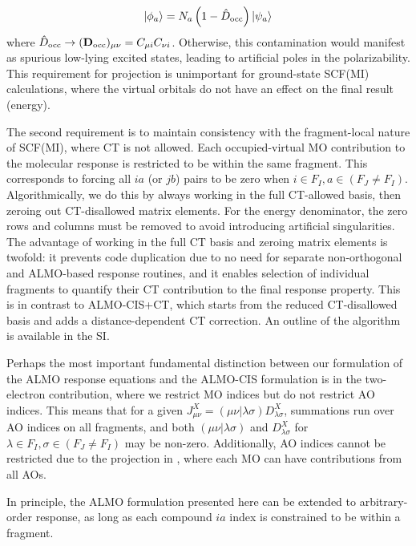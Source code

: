 \documentclass[%
  class = book,%
  crop = false,%
  float = true,%
  multi = true,%
  preview = false,%
]{standalone}
\begin{document}
\begin{equation}
  \label{eq:projected-virtuals}
  \ket{\phi_{a}} = N_{a} \left( 1 - \hat{D}_{\text{occ}} \right) \ket{\psi_{a}}
\end{equation}
where \(\hat{D}_{\text{occ}} \rightarrow (\mathbf{D}_{\text{occ}})_{\mu\nu} = C_{\mu i} C_{\nu i}\). Otherwise, this contamination would manifest as spurious low-lying excited states, leading to artificial poles in the polarizability. This requirement for projection is unimportant for ground-state SCF(MI) calculations, where the virtual orbitals do not have an effect on the final result (energy).

The second requirement is to maintain consistency with the fragment-local nature of SCF(MI), where CT is not allowed. Each occupied-virtual MO contribution to the molecular response is restricted to be within the same fragment. This corresponds to forcing all \(ia\) (or \(jb\)) pairs to be zero when \(i \in F_{I}, a \in (F_{J} \neq F_{I})\). Algorithmically, we do this by always working in the full CT-allowed basis, then zeroing out CT-disallowed matrix elements. For the energy denominator, the zero rows and columns must be removed to avoid introducing artificial singularities. The advantage of working in the full CT basis and zeroing matrix elements is twofold: it prevents code duplication due to no need for separate non-orthogonal and ALMO-based response routines, and it enables selection of individual fragments to quantify their CT contribution to the final response property. This is in contrast to ALMO-CIS+CT\cite{Ge_2017_44111}, which starts from the reduced CT-disallowed basis and adds a distance-dependent CT correction. An outline of the algorithm is available in the SI.

Perhaps the most important fundamental distinction between our formulation of the ALMO response equations and the ALMO-CIS formulation is in the two-electron contribution, where we restrict MO indices but do not restrict AO indices. This means that for a given \(J_{\mu\nu}^{X} = (\mu\nu|\lambda\sigma)D_{\lambda\sigma}^{X}\), summations run over AO indices on all fragments, and both \((\mu\nu|\lambda\sigma)\) and \(D_{\lambda\sigma}^{X}\) for \(\lambda\in F_{I}, \sigma\in (F_{J} \neq F_{I})\) may be non-zero. Additionally, AO indices cannot be restricted due to the projection in , where each MO can have contributions from all AOs.

In principle, the ALMO formulation presented here can be extended to arbitrary-order response, as long as each compound \(ia\) index is constrained to be within a fragment.
\end{document}

